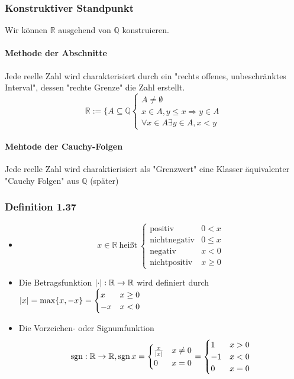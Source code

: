 \documentclass[a4paper]{scrartcl}
\DeclarePairedDelimiter\abs{\lvert}{\rvert}%
\DeclareMathOperator{\Forall}{\forall}%
\DeclareMathOperator{\sgn}{sgn}
\begin{document}
\subsubsection{Konstruktiver Standpunkt}
\label{sec-2-9-4}
Wir können $\mathbb{R}$ ausgehend von $\mathbb{Q}$ konstruieren.
\paragraph{Methode der Abschnitte}
\label{sec-2-9-4-1}
Jede reelle Zahl wird charakterisiert durch ein "rechts offenes, unbeschränktes Interval", dessen "rechte Grenze" die Zahl erstellt.
\[\mathbb{R}:=\{A\subseteq \mathbb{Q}\begin{cases}A\neq\emptyset \\ x\in A, y\leq x\Rightarrow y\in A \\ \Forall x\in A\exists y\in A, x<y\end{cases}\]
\paragraph{Mehtode der Cauchy-Folgen}
\label{sec-2-9-4-2}
Jede reelle Zahl wird charaktierisiert als "Grenzwert" eine Klasser äquivalenter "Cauchy Folgen" aus $\mathbb{Q}$ (später)
\subsubsection{Definition 1.37}
\label{sec-2-9-5}
\begin{itemize}
\item \[x\in \mathbb{R}~\text{heißt}~\begin{cases}\text{positiv} & 0 < x \\ \text{nichtnegativ} & 0\leq x \\ \text{negativ} & x < 0 \\ \text{nichtpositiv} & x\geq 0 \end{cases}\]
\item Die Betragsfunktion $\abs \cdot:\mathbb{R} \to \mathbb{R}$ wird definiert durch $\abs{x} = \max \{x,-x\} = \begin{cases} x & x \geq 0 \\ -x & x < 0\end{cases}$
\item Die Vorzeichen- oder Signumfunktion \[\sgn:\mathbb{R}\to\mathbb{R},\sgn{x} = \begin{cases}\frac{x}{\abs{x}} & x \neq 0 \\ 0 & x = 0\end{cases} = \begin{cases} 1 & x > 0 \\ -1 & x < 0 \\ 0 & x = 0\end{cases}\]
\end{itemize}
\end{document}
